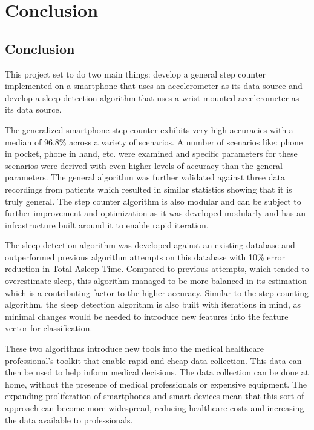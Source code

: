 \part{Conclusion}
\chapter{Conclusion}

This project set to do two main things: develop a general step counter implemented on a smartphone that uses an accelerometer as its data source and develop a sleep detection algorithm that uses a wrist mounted accelerometer as its data source. 

The generalized smartphone step counter exhibits very high accuracies with a median of 96.8\% across a variety of scenarios. A number of scenarios like: phone in pocket, phone in hand, etc. were examined and specific parameters for these scenarios were derived with even higher levels of accuracy than the general parameters. The general algorithm was further validated against three data recordings from patients which resulted in similar statistics showing that it is truly general. The step counter algorithm is also modular and can be subject to further improvement and optimization as it was developed modularly and has an infrastructure built around it to enable rapid iteration. 

The sleep detection algorithm was developed against an existing database and outperformed previous algorithm attempts on this database with 10\% error reduction in Total Asleep Time. Compared to previous attempts, which tended to overestimate sleep, this algorithm managed to be more balanced in its estimation which is a contributing factor to the higher accuracy. Similar to the step counting algorithm, the sleep detection algorithm is also built with iterations in mind, as minimal changes would be needed to introduce new features into the feature vector for classification. 

These two algorithms introduce new tools into the medical healthcare professional's toolkit that enable rapid and cheap data collection. This data can then be used to help inform medical decisions. The data collection can be done at home, without the presence of medical professionals or expensive equipment. The expanding proliferation of smartphones and smart devices mean that this sort of approach can become more widespread, reducing healthcare costs and increasing the data available to professionals. 